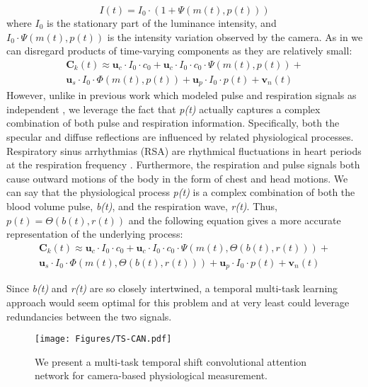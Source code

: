 \documentclass{article}
\begin{document}
\begin{equation} \label{eq:4}
	I(t) = I_0 \cdot (1+\Psi(m(t),p(t))) 
\end{equation}
where $I_0$ is the stationary part of the luminance intensity, and $I_0\cdot\Psi(m(t),p(t))$ is the intensity variation observed by the camera. As in \citep{chen2018deepphys} we can disregard products of time-varying components as they are relatively small:
\begin{multline} \label{eq:7}
	\pmb{C}_k(t)\approx \pmb{u}_c \cdot I_0 \cdot c_0+\pmb{u}_c \cdot I_0 \cdot c_0 \cdot \Psi(m(t),p(t)) + \\
	\pmb{u}_s \cdot I_0 \cdot \Phi(m(t),p(t))+\pmb{u}_p \cdot I_0 \cdot p(t)+\pmb{v}_n(t)
\end{multline}
However, unlike in previous work which modeled pulse and respiration signals as independent \citep{chen2018deepmag}, we leverage the fact that \textit{p(t)} actually captures a complex combination of both pulse and respiration information. Specifically, both the specular and diffuse reflections are influenced by related physiological processes. Respiratory sinus arrhythmias (RSA) are rhythmical fluctuations in heart periods at the respiration frequency \citep{berntson1993respiratory}. Furthermore, the respiration and pulse signals both cause outward motions of the body in the form of chest and head motions. We can say that the physiological process \textit{p(t)} is a complex combination of both the blood volume pulse, \textit{b(t)}, and the respiration wave, \textit{r(t)}. Thus, $p(t) = \Theta(b(t),r(t))$ and the following equation gives a more accurate representation of the underlying process:
\begin{multline} \label{eq:8}
	\pmb{C}_k(t)\approx \pmb{u}_c \cdot I_0 \cdot c_0+\pmb{u}_c \cdot I_0 \cdot c_0 \cdot \Psi(m(t),\Theta(b(t),r(t))) + \\
	\pmb{u}_s \cdot I_0 \cdot \Phi(m(t),\Theta(b(t),r(t)))+\pmb{u}_p \cdot I_0 \cdot p(t)+\pmb{v}_n(t)
\end{multline}

Since \textit{b(t)} and \textit{r(t)} are so closely intertwined, a temporal multi-task learning approach would seem optimal for this problem and at very least could leverage redundancies between the two signals. 


\begin{figure*}[t!]
  \texttt{[image: Figures/TS-CAN.pdf]}
  \caption{We present a multi-task temporal shift convolutional attention network for camera-based physiological measurement. }
  \label{fig:TS-CAN}
\end{figure*}
\end{document}
